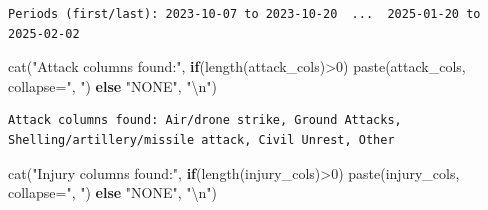 \documentclass[
  letterpaper,
  DIV=11,
  numbers=noendperiod]{scrartcl}
\newenvironment{Shaded}{\begin{snugshade}}{\end{snugshade}}
\newcommand{\AttributeTok}[1]{\textcolor[rgb]{0.40,0.45,0.13}{#1}}
\newcommand{\ControlFlowTok}[1]{\textcolor[rgb]{0.00,0.23,0.31}{\textbf{#1}}}
\newcommand{\DecValTok}[1]{\textcolor[rgb]{0.68,0.00,0.00}{#1}}
\newcommand{\FunctionTok}[1]{\textcolor[rgb]{0.28,0.35,0.67}{#1}}
\newcommand{\NormalTok}[1]{\textcolor[rgb]{0.00,0.23,0.31}{#1}}
\newcommand{\SpecialCharTok}[1]{\textcolor[rgb]{0.37,0.37,0.37}{#1}}
\newcommand{\StringTok}[1]{\textcolor[rgb]{0.13,0.47,0.30}{#1}}
\begin{document}
\begin{Shaded}
\end{Shaded}

\begin{verbatim}
Periods (first/last): 2023-10-07 to 2023-10-20  ...  2025-01-20 to 2025-02-02 
\end{verbatim}

\begin{Shaded}
\begin{Highlighting}[]
\FunctionTok{cat}\NormalTok{(}\StringTok{"Attack columns found:"}\NormalTok{, }\ControlFlowTok{if}\NormalTok{(}\FunctionTok{length}\NormalTok{(attack\_cols)}\SpecialCharTok{\textgreater{}}\DecValTok{0}\NormalTok{) }\FunctionTok{paste}\NormalTok{(attack\_cols, }\AttributeTok{collapse=}\StringTok{", "}\NormalTok{) }\ControlFlowTok{else} \StringTok{"NONE"}\NormalTok{, }\StringTok{"}\SpecialCharTok{\textbackslash{}n}\StringTok{"}\NormalTok{)}
\end{Highlighting}
\end{Shaded}

\begin{verbatim}
Attack columns found: Air/drone strike, Ground Attacks, Shelling/artillery/missile attack, Civil Unrest, Other 
\end{verbatim}

\begin{Shaded}
\begin{Highlighting}[]
\FunctionTok{cat}\NormalTok{(}\StringTok{"Injury columns found:"}\NormalTok{, }\ControlFlowTok{if}\NormalTok{(}\FunctionTok{length}\NormalTok{(injury\_cols)}\SpecialCharTok{\textgreater{}}\DecValTok{0}\NormalTok{) }\FunctionTok{paste}\NormalTok{(injury\_cols, }\AttributeTok{collapse=}\StringTok{", "}\NormalTok{) }\ControlFlowTok{else} \StringTok{"NONE"}\NormalTok{, }\StringTok{"}\SpecialCharTok{\textbackslash{}n}\StringTok{"}\NormalTok{)}
\end{Highlighting}
\end{Shaded}
\end{document}
